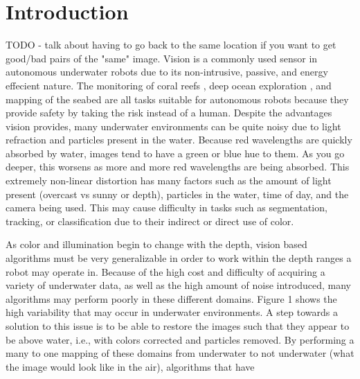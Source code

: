 \documentclass[conference,reqno]{IEEEtran}
\begin{document}
\IEEEpeerreviewmaketitle

\section{Introduction}
TODO - talk about having to go back to the same location if you want to get good/bad pairs of the "same" image.
Vision is a commonly used sensor in autonomous underwater robots due to its non-intrusive, passive, and energy
effecient nature. The monitoring of coral reefs \cite{shkurti2012multi}, deep ocean exploration
\cite{whitcomb2000advances}, and mapping of the seabed are all tasks suitable for autonomous robots because they
provide safety by taking the risk instead of a human. Despite the advantages vision provides, many underwater
environments can be quite noisy due to light refraction and particles present in the water. Because red wavelengths are
quickly absorbed by water, images tend to have a green or blue hue to them. As you go deeper, this worsens as more
and more red wavelengths are being absorbed. This extremely non-linear distortion has many factors such as the amount
of light present (overcast vs sunny or depth), particles in the water, time of day, and the camera being used. This may
cause difficulty in tasks such as segmentation, tracking, or classification due to their indirect or direct use of
color.

As color and illumination begin to change with the depth, vision based algorithms must be very generalizable in order
to work within the depth ranges a robot may operate in. Because of the high cost and difficulty of acquiring a
variety of underwater data, as well as the high amount of noise introduced, many algorithms may perform poorly in
these different domains. Figure 1 shows the high variability that may occur in underwater environments. A step towards a
solution to this
issue is to be able to restore the images such that they appear to be above water, i.e., with colors corrected and
particles removed. By performing a many to one mapping of these domains from underwater to not underwater (what the
image would look like in the air), algorithms that have
\end{document}
